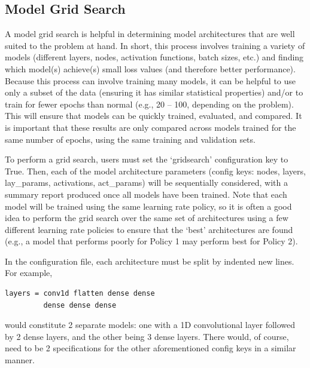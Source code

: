 \documentclass[letterpaper, 12pt]{article}
\begin{document}
\subsection{Model Grid Search}

A model grid search is helpful in determining model architectures that are 
well suited to the problem at hand.  In short, this process involves training 
a variety of models (different layers, nodes, activation functions, batch 
sizes, etc.) and finding which model(s) achieve(s) small loss values (and 
therefore better performance).  Because this process can involve training 
many models, it can be  helpful to use only a subset of the data (ensuring 
it has similar statistical properties) and/or to train for fewer epochs than 
normal (e.g., 20 -- 100, depending on the problem).  This will ensure that 
models can be quickly trained, evaluated, and compared.  It is important 
that these results are only compared across models trained for the same 
number of epochs, using the same training and validation sets. \newline

\noindent To perform a grid search, users must set the `gridsearch' 
configuration key to True.  Then, each of the model architecture parameters 
(config keys: nodes, layers, lay\_params, activations, act\_params)
will be sequentially considered, with a summary report produced once all 
models have been trained.  Note that each model will be trained using the same 
learning rate policy, so it is often a good idea to perform the grid search over
the same set of architectures using a few different learning rate policies to 
ensure that the `best' architectures are found (e.g., a model that performs 
poorly for Policy 1 may perform best for Policy 2). \newline

\noindent In the configuration file, each architecture must be split by indented
new lines.  For example, 
\begin{verbatim}
layers = conv1d flatten dense dense
         dense dense dense
\end{verbatim}
\noindent would constitute 2 separate models: one with a 1D convolutional layer 
followed by 2 dense layers, and the other being 3 dense layers.  There would, 
of course, need to be 2 specifications for the other aforementioned config keys 
in a similar manner.\newline
\end{document}
